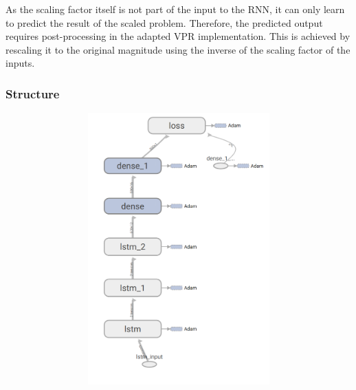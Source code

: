 As the scaling factor itself is not part of the input to the \gls{RNN}, it can only learn to predict the result of the scaled problem. Therefore, the predicted output requires post-processing in the adapted \gls{VPR} implementation. This is achieved by rescaling it to the original magnitude using the inverse of the scaling factor of the inputs.

\subsubsection{Structure}\label{ch:rnn-design}

\begin{figure}
	\centering
	\begin{subfigure}[b]{0.3\linewidth}
		\begin{subfigure}[b]{\linewidth}
			\includegraphics[width=\linewidth]{plots/rnn-candidates-3-lstm-2-dense.png}

\end{subfigure}
\end{subfigure}
\end{figure}
